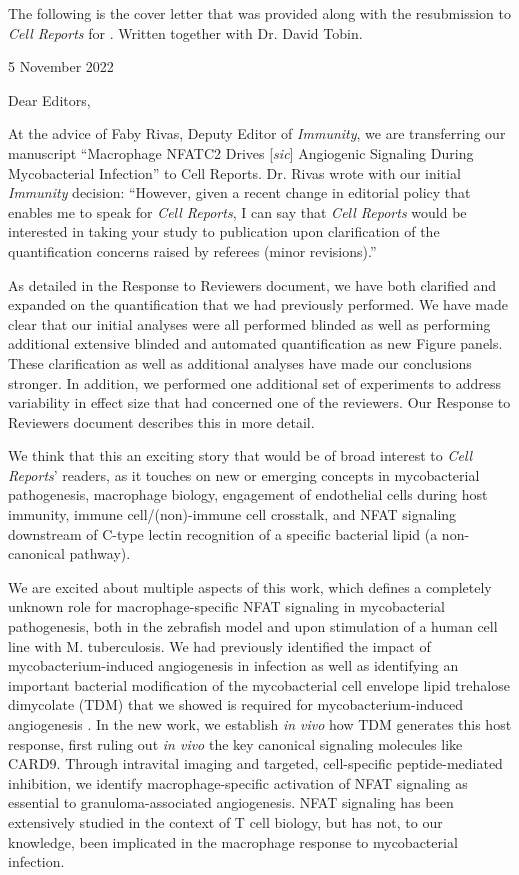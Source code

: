 The following is the cover letter that was provided along with the resubmission to \textit{Cell Reports} for \citet{Brewer2022}. Written together with Dr. David Tobin. 

\begin{flushright}
5 November 2022
\end{flushright}

Dear Editors,

At the advice of Faby Rivas, Deputy Editor of \textit{Immunity}, we are transferring our manuscript “Macrophage NFATC2 Drives [\textit{sic}] Angiogenic Signaling During Mycobacterial Infection” to Cell Reports. Dr. Rivas wrote with our initial \textit{Immunity} decision: ``However, given a recent change in editorial policy that enables me to speak for \textit{Cell Reports}, I can say that \textit{Cell Reports} would be interested in taking your study to publication upon clarification of the quantification concerns raised by referees (minor revisions).''

As detailed in the Response to Reviewers document, we have both clarified and expanded on the quantification that we had previously performed. We have made clear that our initial analyses were all performed blinded as well as performing additional extensive blinded and automated quantification as new Figure panels. These clarification as well as additional analyses have made our conclusions stronger. In addition, we performed one additional set of experiments to address variability in effect size that had concerned one of the reviewers. Our Response to Reviewers document describes this in more detail.

We think that this an exciting story that would be of broad interest to \textit{Cell Reports}' readers, as it touches on new or emerging concepts in mycobacterial pathogenesis, macrophage biology, engagement of endothelial cells during host immunity, immune cell/(non)\hyp{}immune cell crosstalk, and NFAT signaling downstream of C\hyp{}type lectin recognition of a specific bacterial lipid (a non\hyp{}canonical pathway).

We are excited about multiple aspects of this work, which defines a completely unknown role for macrophage\hyp{}specific NFAT signaling in mycobacterial pathogenesis, both in the zebrafish model and upon stimulation of a human cell line with M. tuberculosis. We had previously identified the impact of mycobacterium\hyp{}induced angiogenesis in infection \citep{Oehlers2015} as well as identifying an important bacterial modification of the mycobacterial cell envelope lipid trehalose dimycolate (TDM) that we showed is required for mycobacterium\hyp{}induced angiogenesis \citep{Walton2018}. In the new work, we establish \textit{in vivo} how TDM generates this host response, first ruling out \textit{in vivo} the key canonical signaling molecules like CARD9. Through intravital imaging and targeted, cell\hyp{}specific peptide\hyp{}mediated inhibition, we identify macrophage\hyp{}specific activation of NFAT signaling as essential to granuloma\hyp{}associated angiogenesis. NFAT signaling has been extensively studied in the context of T cell biology, but has not, to our knowledge, been implicated in the macrophage response to mycobacterial infection.

